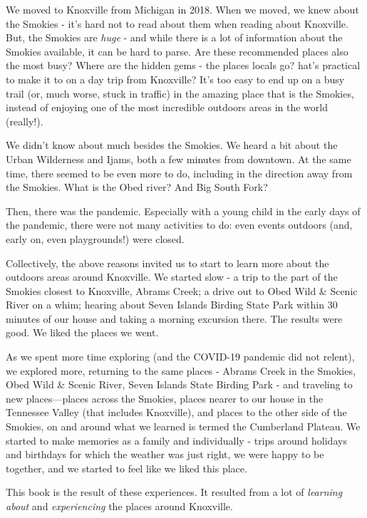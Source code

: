 \documentclass[
]{book}
\begin{document}
We moved to Knoxville from Michigan in 2018. When we moved, we knew about the Smokies - it's hard not to read about them when reading about Knoxville. But, the Smokies are \emph{huge} - and while there is a lot of information about the Smokies available, it can be hard to parse. Are these recommended places also the most busy? Where are the hidden gems - the places locals go? hat's practical to make it to on a day trip from Knoxville? It's too easy to end up on a busy trail (or, much worse, stuck in traffic) in the amazing place that is the Smokies, instead of enjoying one of the most incredible outdoors areas in the world (really!).

We didn't know about much besides the Smokies. We heard a bit about the Urban Wilderness and Ijams, both a few minutes from downtown. At the same time, there seemed to be even more to do, including in the direction away from the Smokies. What is the Obed river? And Big South Fork?

Then, there was the pandemic. Especially with a young child in the early days of the pandemic, there were not many activities to do: even events outdoors (and, early on, even playgrounds!) were closed.

Collectively, the above reasons invited us to start to learn more about the outdoors areas around Knoxville. We started slow - a trip to the part of the Smokies closest to Knoxville, Abrams Creek; a drive out to Obed Wild \& Scenic River on a whim; hearing about Seven Islands Birding State Park within 30 minutes of our house and taking a morning excursion there. The results were good. We liked the places we went.

As we spent more time exploring (and the COVID-19 pandemic did not relent), we explored more, returning to the same places - Abrams Creek in the Smokies, Obed Wild \& Scenic River, Seven Islands State Birding Park - and traveling to new places---places across the Smokies, places nearer to our house in the Tennessee Valley (that includes Knoxville), and places to the other side of the Smokies, on and around what we learned is termed the Cumberland Plateau. We started to make memories as a family and individually - trips around holidays and birthdays for which the weather was just right, we were happy to be together, and we started to feel like we liked this place.

This book is the result of these experiences. It resulted from a lot of \emph{learning about} and \emph{experiencing} the places around Knoxville.
\end{document}
